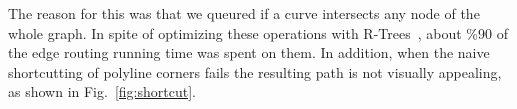 \documentclass{gd-llncs}
\newcommand{\comm}[1]{}
\begin{document}
The reason for this was that we queured if a curve intersects any node of the whole graph. In spite of optimizing these operations with R-Trees~\cite{guttman1984r}, about \%90 of the edge routing running time was spent on them. In addition, when the naive shortcutting of polyline corners fails the resulting path is not visually appealing, as shown in Fig.~\ref{fig:shortcut}.



\comm{
  \section{Further Examples}
}


\end{document}

